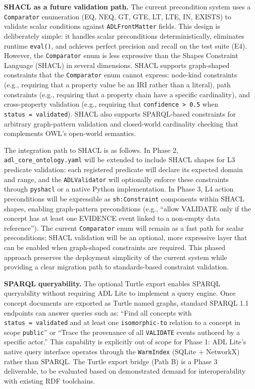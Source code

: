 \textbf{SHACL as a future validation path.} The current precondition system uses a \texttt{Comparator} enumeration (EQ, NEQ, GT, GTE, LT, LTE, IN, EXISTS) to validate scalar conditions against \texttt{ADLFrontMatter} fields. This design is deliberately simple: it handles scalar preconditions deterministically, eliminates runtime \texttt{eval()}, and achieves perfect precision and recall on the test suite (E4). However, the \texttt{Comparator} enum is less expressive than the Shapes Constraint Language (SHACL) \cite{ref23} in several dimensions. SHACL supports graph-shaped constraints that the \texttt{Comparator} enum cannot express: node-kind constraints (e.g., requiring that a property value be an IRI rather than a literal), path constraints (e.g., requiring that a property chain have a specific cardinality), and cross-property validation (e.g., requiring that \texttt{confidence\ \textgreater{}\ 0.5} when \texttt{status\ =\ validated}). SHACL also supports SPARQL-based constraints for arbitrary graph-pattern validation and closed-world cardinality checking that complements OWL's open-world semantics.

The integration path to SHACL is as follows. In Phase 2, \texttt{adl\_core\_ontology.yaml} will be extended to include SHACL shapes for L3 predicate validation: each registered predicate will declare its expected domain and range, and the \texttt{ADLValidator} will optionally enforce these constraints through \texttt{pyshacl} or a native Python implementation. In Phase 3, L4 action preconditions will be expressible as \texttt{sh:Constraint} components within SHACL shapes, enabling graph-pattern preconditions (e.g., ``allow VALIDATE only if the concept has at least one EVIDENCE event linked to a non-empty data reference''). The current \texttt{Comparator} enum will remain as a fast path for scalar preconditions; SHACL validation will be an optional, more expressive layer that can be enabled when graph-shaped constraints are required. This phased approach preserves the deployment simplicity of the current system while providing a clear migration path to standards-based constraint validation.

\textbf{SPARQL queryability.} The optional Turtle export enables SPARQL queryability without requiring ADL Lite to implement a query engine. Once concept documents are exported as Turtle named graphs, standard SPARQL 1.1 endpoints can answer queries such as: ``Find all concepts with \texttt{status\ =\ validated} and at least one \texttt{isomorphic-to} relation to a concept in scope \texttt{public}'' or ``Trace the provenance of all \texttt{VALIDATE} events authored by a specific actor.'' This capability is explicitly out of scope for Phase 1: ADL Lite's native query interface operates through the \texttt{WarmIndex} (SQLite + NetworkX) rather than SPARQL. The Turtle export bridge (Path B) is a Phase 3 deliverable, to be evaluated based on demonstrated demand for interoperability with existing RDF toolchains.

